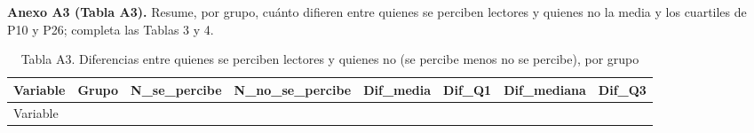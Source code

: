 \documentclass[
  spanish,
  12pt,
]{extarticle}
\begin{document}
\textbf{Anexo A3 (Tabla A3).} Resume, por grupo, cuánto difieren entre
quienes se perciben lectores y quienes no la media y los cuartiles de
P10 y P26; completa las Tablas 3 y 4.

\begin{longtable}[]{@{}
  >{\raggedright\arraybackslash}p{}
  >{\raggedright\arraybackslash}p{}
  >{\raggedleft\arraybackslash}p{}
  >{\raggedleft\arraybackslash}p{}
  >{\raggedleft\arraybackslash}p{}
  >{\raggedleft\arraybackslash}p{}
  >{\raggedleft\arraybackslash}p{}
  >{\raggedleft\arraybackslash}p{}@{}}
\caption{Tabla A3. Diferencias entre quienes se perciben lectores y
quienes no (se percibe menos no se percibe), por grupo}\tabularnewline
\toprule\noalign{}
\begin{minipage}[b]{\linewidth}\raggedright
Variable
\end{minipage} & \begin{minipage}[b]{\linewidth}\raggedright
Grupo
\end{minipage} & \begin{minipage}[b]{\linewidth}\raggedleft
N\_se\_percibe
\end{minipage} & \begin{minipage}[b]{\linewidth}\raggedleft
N\_no\_se\_percibe
\end{minipage} & \begin{minipage}[b]{\linewidth}\raggedleft
Dif\_media
\end{minipage} & \begin{minipage}[b]{\linewidth}\raggedleft
Dif\_Q1
\end{minipage} & \begin{minipage}[b]{\linewidth}\raggedleft
Dif\_mediana
\end{minipage} & \begin{minipage}[b]{\linewidth}\raggedleft
Dif\_Q3
\end{minipage} \\
\midrule\noalign{}
\endfirsthead
\toprule\noalign{}
\begin{minipage}[b]{\linewidth}\raggedright
Variable
\end{minipage} & \begin{minipage}[b]{\linewidth}\raggedright

\end{minipage}
\end{longtable}
\end{document}

